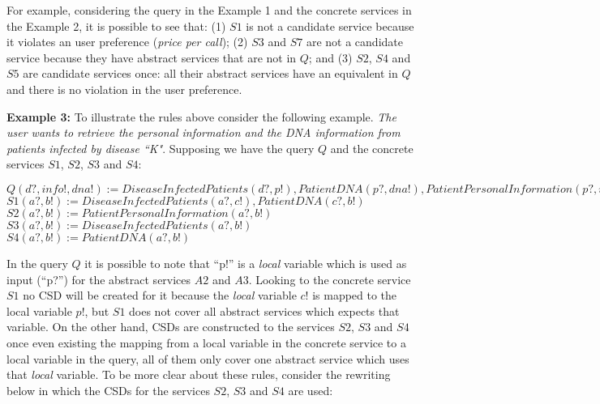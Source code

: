 For example, considering the query in the Example 1 and the concrete services in the Example 2, it is possible to see that:
(1) $S1$ is not a candidate service because it violates an user preference (\textit{price per call});
(2) $S3$ and $S7$ are not a candidate service because they have abstract services that are not in $Q$; and
(3) $S2$, $S4$ and $S5$ are candidate services once: all their abstract services have an equivalent in $Q$ and there is no violation in the user preference.



\noindent \textbf{Example 3:} To illustrate the rules above consider the following example. 
\textit{The user wants to retrieve the personal information and the DNA information from patients infected by disease ``K"}.
Supposing we have the query $Q$ and the concrete services $S1$, $S2$, $S3$ and $S4$:

\begin{center}
$Q (d?, info!, dna!) := DiseaseInfectedPatients(d?, p!), PatientDNA(p?, dna!), PatientPersonalInformation(p?, info!)$ \\
$S1 (a?, b!) := DiseaseInfectedPatients(a?, c!), PatientDNA(c?, b!)$ \\
$S2 (a?, b!) := PatientPersonalInformation(a?, b!)$ \\
$S3 (a?, b!) := DiseaseInfectedPatients(a?, b!)$ \\
$S4 (a?, b!) := PatientDNA(a?, b!)$ \\
\end{center} 

In the query $Q$ it is possible to note that ``p!'' is a \textit{local} variable which is used as input (``p?'') for the abstract services $A2$ and $A3$. 
Looking to the concrete service $S1$ no CSD will be created for it because the \textit{local} variable $c!$ is mapped to the local variable $p!$, but $S1$ does not cover all abstract services which expects that variable. 
On the other hand, CSDs are constructed to the services $S2$, $S3$ and $S4$ once even existing the mapping from a local variable in the concrete service to a local variable in the query, all of them only cover one abstract service which uses that \textit{local} variable.
To be more clear about these rules, consider the rewriting below in which the CSDs for the services  $S2$, $S3$ and $S4$ are used:

